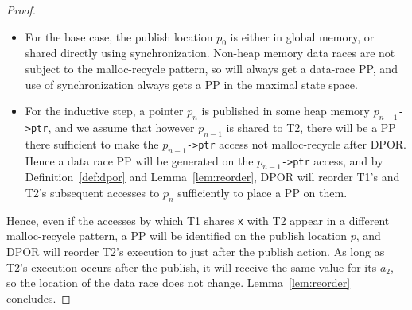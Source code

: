 \begin{proof}
\newcommand\publish[1]{$p_{#1}$}
\begin{itemize}
	\item For the base case, the publish location \publish{0} is either in global memory, or shared directly using synchronization.
		Non-heap memory data races are not subject to the malloc-recycle pattern, so will always get a data-race PP,
		and use of synchronization always gets a PP in the maximal state space.
	\item For the inductive step, a pointer \publish{n} is published in some heap memory \publish{n-1}\texttt{->ptr},
		and we assume that however \publish{n-1} is shared to T2,
		there will be a PP there
		sufficient to make the \publish{n-1}\texttt{->ptr} access not malloc-recycle after DPOR.
		Hence a data race PP will be generated on the \publish{n-1}\texttt{->ptr} access,
		and by Definition~\ref{def:dpor} and Lemma~\ref{lem:reorder},
		DPOR will reorder T1's and T2's subsequent accesses to \publish{n} sufficiently to place a PP on them.
\end{itemize}

Hence, even if the accesses by which T1 shares {\tt x} with T2 appear in a different malloc-recycle pattern,
a PP will be identified on the publish location $p$,
and DPOR will reorder T2's execution to just after the publish action.
As long as T2's execution occurs after the publish, it will receive the same value for its $a_2$, so the location of the data race does not change.
Lemma~\ref{lem:reorder} concludes.
\end{proof}


